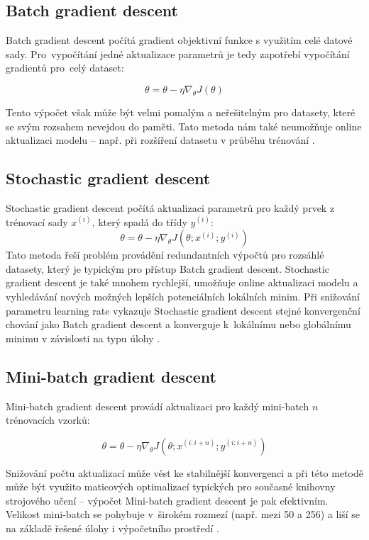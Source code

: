 \subsection*{Batch gradient descent}
Batch gradient descent počítá gradient objektivní funkce s využitím celé datové sady. Pro~vypočítání jedné aktualizace parametrů je tedy zapotřebí vypočítání gradientů pro~celý dataset: 

  \begin{equation} 
    \theta = \theta - \eta\nabla_{\theta}J(\theta)
    \end{equation} 

Tento výpočet však může být velmi pomalým a neřešitelným pro datasety, které se svým rozsahem nevejdou do paměti. Tato metoda nám také neumožňuje online aktualizaci modelu -- např. při rozšíření datasetu v průběhu trénování \cite{GradientDescent}.

\subsection*{Stochastic gradient descent}
Stochastic gradient descent počítá aktualizaci parametrů pro každý prvek z trénovací sady $x^{(i)}$, který spadá do třídy $y^{(i)}$:
  \begin{equation} 
    \theta = \theta - \eta\nabla_{\theta}J(\theta;x^{(i)};y^{(i)})
    \end{equation} 
Tato metoda řeší problém provádění redundantních výpočtů pro rozsáhlé datasety, který je typickým pro přístup Batch gradient descent. Stochastic gradient descent je také mnohem rychlejší, umožňuje online aktualizaci modelu a vyhledávání nových možných lepších potenciálních lokálních minim. Při snižování parametru learning rate vykazuje Stochastic gradient descent stejné konvergenční chování jako Batch gradient descent a konverguje k~lokálnímu nebo globálnímu minimu v závislosti na typu úlohy \cite{GradientDescent}.

\subsection*{Mini-batch gradient descent}
Mini-batch gradient descent provádí aktualizaci pro každý mini-batch $n$ trénovacích vzorků: 

\begin{equation} 
    \theta = \theta - \eta\nabla_{\theta}J(\theta;x^{(i:i+n)};y^{(i:i+n)})
    \end{equation} 

Snižování počtu aktualizací může vést ke stabilnější konvergenci a při této metodě může být využito maticových optimalizací typických pro současné knihovny strojového učení -- výpočet Mini-batch gradient descent je pak efektivním. Velikost mini-batch se pohybuje v~širokém rozmezí (např. mezi 50 a 256) a liší se na základě řešené úlohy i výpočetního prostředí \cite{GradientDescent}. 



